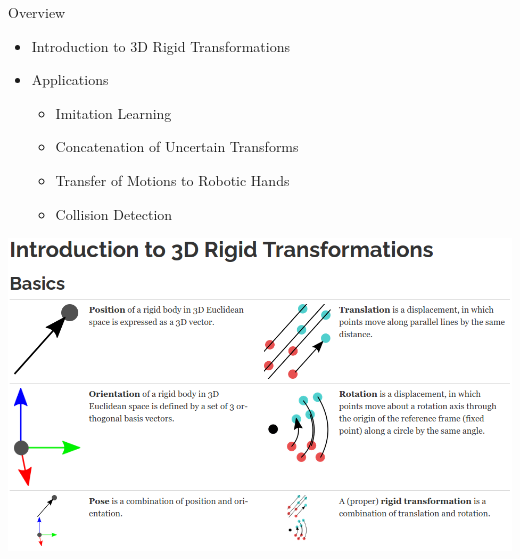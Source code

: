 \documentclass[14pt]{beamer}
\begin{document}
\begin{frame}{Overview}
\begin{itemize}
\item Introduction to 3D Rigid Transformations
\item Applications
\begin{itemize}
\item Imitation Learning
\item Concatenation of Uncertain Transforms
\item Transfer of Motions to Robotic Hands
\item Collision Detection
\end{itemize}
\end{itemize}
\end{frame}

\begin{frame}
\includegraphics[width=\textwidth]{images/introduction}
\end{frame}
\end{document}

